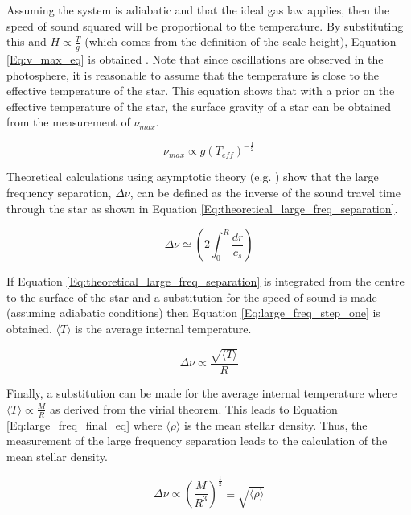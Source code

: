 Assuming the system is adiabatic and that the ideal gas law applies, then the speed of sound squared will be proportional to the temperature. By substituting this and $H \propto \frac{T}{g}$ (which comes from the definition of the scale height), Equation \ref{Eq:v_max_eq} is obtained \citep{Kjeldsen_Bedding_1995}. Note that since oscillations are observed in the photosphere, it is reasonable to assume that the temperature is close to the effective temperature of the star. This equation shows that with a prior on the effective temperature of the star, the surface gravity of a star can be obtained from the measurement of $\nu_{max}$.

\begin{equation}
    \nu_{max} \propto g(T_{eff})^{-\frac{1}{2}}
    \label{Eq:v_max_eq}
\end{equation}

Theoretical calculations using asymptotic theory (e.g. \citealt{Christensen_Dalsgaard_1988}) show that the large frequency separation, $\Delta\nu$, can be defined as the inverse of the sound travel time through the star as shown in Equation \ref{Eq:theoretical_large_freq_separation}.

\begin{equation}
    \Delta\nu \simeq \left(2 \int_{0}^{R} \frac{dr}{c_{s}} \right)
    \label{Eq:theoretical_large_freq_separation}
\end{equation}

If Equation \ref{Eq:theoretical_large_freq_separation} is integrated from the centre to the surface of the star and a substitution for the speed of sound is made (assuming adiabatic conditions) then Equation \ref{Eq:large_freq_step_one} is obtained. $\langle T \rangle$ is the average internal temperature.

\begin{equation}
    \Delta\nu \propto \frac{\sqrt{\langle T \rangle}}{R}
    \label{Eq:large_freq_step_one}
\end{equation}

Finally, a substitution can be made for the average internal temperature where $\langle T \rangle \propto \frac{M}{R}$ as derived from the virial theorem. This leads to Equation \ref{Eq:large_freq_final_eq} where $\langle \rho \rangle$ is the mean stellar density. Thus, the measurement of the large frequency separation leads to the calculation of the mean stellar density.

\begin{equation}
    \Delta\nu \propto \left(\frac{M}{R^{3}} \right)^{\frac{1}{2}} \equiv \sqrt{\langle \rho \rangle}
    \label{Eq:large_freq_final_eq}
\end{equation}

